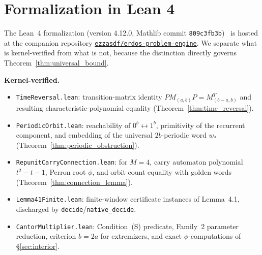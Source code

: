 \documentclass[11pt,reqno]{amsart}
\theoremstyle{plain}
\theoremstyle{definition}
\theoremstyle{remark}
\begin{document}
\clearpage

\section{Formalization in Lean 4}\label{sec:formalization}

{\small
The Lean~4 formalization (version 4.12.0, Mathlib commit \texttt{809c3fb3b})~\cite{Lean4Community} is hosted at the companion repository \href{https://github.com/ezzasdf/erdos-problem-engine}{\texttt{ezzasdf/erdos-problem-engine}}. We separate what is kernel-verified from what is not, because the distinction directly governs Theorem~\ref{thm:universal_bound}.

\textbf{Kernel-verified.}
\begin{itemize}\setlength{\itemsep}{0pt}\setlength{\parsep}{0pt}\setlength{\parskip}{0pt}\setlength{\topsep}{1pt}\setlength{\partopsep}{0pt}
    \item \texttt{TimeReversal.lean}: transition-matrix identity $P M_{(a,b)} P = M_{(b-a,b)}^{T}$ and resulting characteristic-polynomial equality (Theorem~\ref{thm:time_reversal}).
    \item \texttt{PeriodicOrbit.lean}: reachability of $0^b \leftrightarrow 1^b$, primitivity of the recurrent component, and embedding of the universal $2b$-periodic word $w_*$ (Theorem~\ref{thm:periodic_obstruction}).
    \item \texttt{RepunitCarryConnection.lean}: for $M = 4$, carry automaton polynomial $t^2 - t - 1$, Perron root $\phi$, and orbit count equality with golden words (Theorem~\ref{thm:connection_lemma}).
    \item \texttt{Lemma41Finite.lean}: finite-window certificate instances of Lemma~4.1, discharged by \texttt{decide}/\texttt{native\_decide}.
    \item \texttt{CantorMultiplier.lean}: Condition~(S) predicate, Family~2 parameter reduction, criterion $b = 2a$ for extremizers, and exact $\phi$-computations of §\ref{sec:interior}.
\end{itemize}

}
\end{document}
